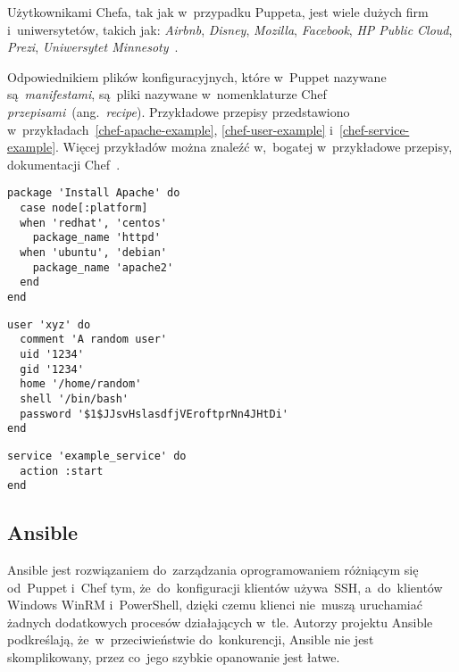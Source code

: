\documentclass[thesis]{subfiles}
\begin{document}
Użytkownikami Chefa, tak jak w~przypadku Puppeta, jest wiele dużych firm i~uniwersytetów, takich jak: \emph{Airbnb}, \emph{Disney}, \emph{Mozilla}, \emph{Facebook}, \emph{HP Public Cloud}, \emph{Prezi}, \emph{Uniwersytet Minnesoty}~\cite{chef-customers,puppet-chef-disney}.

Odpowiednikiem plików konfiguracyjnych, które w~Puppet nazywane są~\emph{manifestami}, są~pliki nazywane w~nomenklaturze Chef \emph{przepisami}~(ang.~\emph{recipe}). Przykładowe przepisy przedstawiono w~przykładach~\ref{chef-apache-example}, \ref{chef-user-example} i~\ref{chef-service-example}. Więcej przykładów można znaleźć w,~bogatej w~przykładowe przepisy, dokumentacji Chef~\cite{chef-examples}.

\begin{lstlisting}[numbers=none,caption={Przepis Chef gwarantujący, że serwer Apache zostanie zainstalowany niezależnie od~tego jak~się~nazywa paczka oprogramowania go~dostarczająca},label=chef-apache-example]
package 'Install Apache' do
  case node[:platform]
  when 'redhat', 'centos'
    package_name 'httpd'
  when 'ubuntu', 'debian'
    package_name 'apache2'
  end
end
\end{lstlisting}

\begin{lstlisting}[numbers=none,caption={Przepis Chef gwarantujący, że użytkownik \texttt{xyz} istnieje w~systemie i~ma zadane ustawienia konta},label=chef-user-example]
user 'xyz' do
  comment 'A random user'
  uid '1234'
  gid '1234'
  home '/home/random'
  shell '/bin/bash'
  password '$1$JJsvHslasdfjVEroftprNn4JHtDi'
end
\end{lstlisting}

\begin{lstlisting}[numbers=none,caption={Przepis Chef gwarantujący, że serwis \texttt{example\_service} jest uruchomiony},label=chef-service-example]
service 'example_service' do
  action :start
end
\end{lstlisting}


\subsection{Ansible}

Ansible jest rozwiązaniem do~zarządzania oprogramowaniem różniącym się od~Puppet i~Chef tym, że~do~konfiguracji klientów  używa~SSH, a~do~klientów Windows WinRM i~PowerShell, dzięki czemu klienci nie~muszą uruchamiać żadnych dodatkowych procesów działających w~tle. Autorzy projektu Ansible podkreślają, że~w~przeciwieństwie do~konkurencji, Ansible nie jest skomplikowany, przez co~jego szybkie opanowanie jest łatwe.
\end{document}
